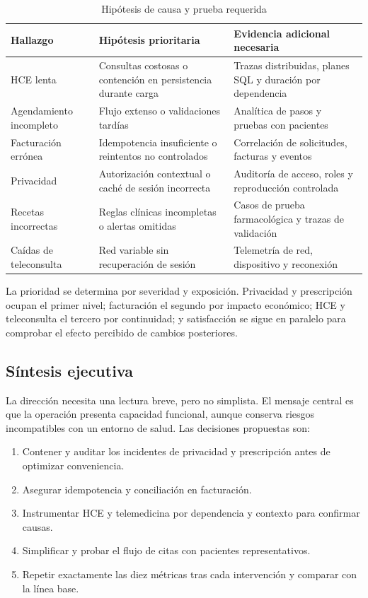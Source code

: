 \begin{table}[H]
\centering
\caption{Hipótesis de causa y prueba requerida}
\begin{tabularx}{\textwidth}{p{3.4cm}YY}
\toprule
Hallazgo & Hipótesis prioritaria & Evidencia adicional necesaria \\
\midrule
HCE lenta & Consultas costosas o contención en persistencia durante carga & Trazas distribuidas, planes SQL y duración por dependencia \\
Agendamiento incompleto & Flujo extenso o validaciones tardías & Analítica de pasos y pruebas con pacientes \\
Facturación errónea & Idempotencia insuficiente o reintentos no controlados & Correlación de solicitudes, facturas y eventos \\
Privacidad & Autorización contextual o caché de sesión incorrecta & Auditoría de acceso, roles y reproducción controlada \\
Recetas incorrectas & Reglas clínicas incompletas o alertas omitidas & Casos de prueba farmacológica y trazas de validación \\
Caídas de teleconsulta & Red variable sin recuperación de sesión & Telemetría de red, dispositivo y reconexión \\
\bottomrule
\end{tabularx}
\end{table}

La prioridad se determina por severidad y exposición. Privacidad y prescripción ocupan el primer nivel; facturación el segundo por impacto económico; HCE y teleconsulta el tercero por continuidad; y satisfacción se sigue en paralelo para comprobar el efecto percibido de cambios posteriores.

\subsection{Síntesis ejecutiva}


La dirección necesita una lectura breve, pero no simplista. El mensaje central es que la operación presenta capacidad funcional, aunque conserva riesgos incompatibles con un entorno de salud. Las decisiones propuestas son:

\begin{enumerate}
  \item Contener y auditar los incidentes de privacidad y prescripción antes de optimizar conveniencia.
  \item Asegurar idempotencia y conciliación en facturación.
  \item Instrumentar HCE y telemedicina por dependencia y contexto para confirmar causas.
  \item Simplificar y probar el flujo de citas con pacientes representativos.
  \item Repetir exactamente las diez métricas tras cada intervención y comparar con la línea base.
\end{enumerate}

